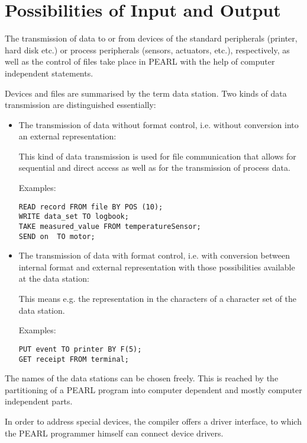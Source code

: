 \section{Possibilities of Input and Output}   %

The transmission of data to or from devices of the standard peripherals (printer, hard disk etc.) 
or process peripherals (sensors, 
actuators, etc.), respectively, as well as the control of files take place in PEARL with 
the help of computer independent statements.

Devices and files are summarised by the term data station. Two kinds of
data transmission are distinguished essentially:

\begin{itemize}
\item The transmission of data without format control, i.e. without
      conversion into an external representation:

      This kind of data transmission is used for file communication that
      allows for sequential and direct access as well as for the transmission
      of process data.

      Examples:
\begin{lstlisting}
READ record FROM file BY POS (10);
WRITE data_set TO logbook;
TAKE measured_value FROM temperatureSensor;
SEND on  TO motor;
\end{lstlisting}

\item The transmission of data with format control, i.e. with conversion
      between internal format and external representation with those
      possibilities available at the data station:

      This means e.g. the representation in the characters of a character set
      of the data station.

      Examples:

\begin{lstlisting}
PUT event TO printer BY F(5);
GET receipt FROM terminal;
\end{lstlisting}
\end{itemize}

The names of the data stations can be chosen freely. This is reached by the
partitioning of a PEARL program into computer dependent and mostly
computer independent parts.

In order to address special devices, the compiler offers a driver
interface, to which the PEARL programmer himself can connect device
drivers.

